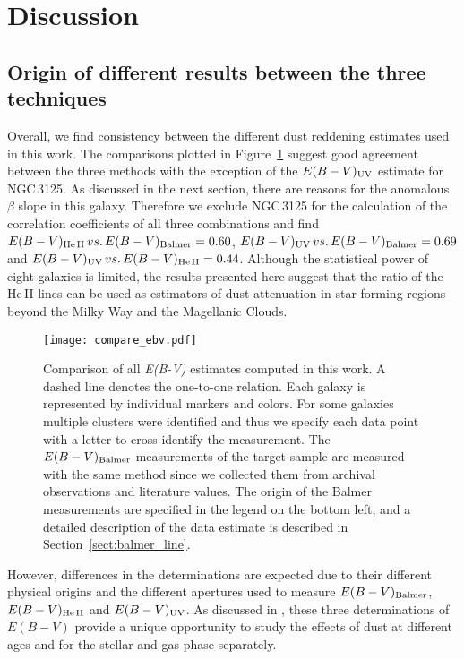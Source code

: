 \documentclass[]{aastex63}
\begin{document}
\section{Discussion}\label{sect:discussion}

\subsection{Origin of different results between the three techniques}
Overall, we find consistency between the different dust reddening estimates used in this work. The comparisons plotted in Figure~\ref{fig:compare_ebv} suggest good agreement between the three methods with the exception of the $E(B-V)_{\rm UV}$ estimate for NGC\,3125. As discussed in the next section, there are reasons for the anomalous $\beta$ slope in this galaxy. Therefore we exclude NGC\,3125 for the calculation of the correlation coefficients of all three combinations and find $E(B-V)_{\rm He\,II} \,vs.\, E(B-V)_{\rm Balmer} = 0.60$, $E(B-V)_{\rm UV} \,vs.\, E(B-V)_{\rm Balmer} = 0.69$ and $E(B-V)_{\rm UV} \,vs.\, E(B-V)_{\rm He\,II} = 0.44$.  Although the statistical power of eight galaxies is limited, the results presented here suggest that the ratio of the He\,II lines can be used as estimators of dust attenuation in star forming regions beyond the Milky Way and the Magellanic Clouds.


%
\begin{figure*}[h!]
    \centering
    \texttt{[image: compare\_ebv.pdf]}
    \caption{Comparison of all {\it E(B-V)} estimates computed in this work. A dashed line denotes the one-to-one relation. Each galaxy is represented by individual markers and colors. For some galaxies multiple clusters were identified and thus we specify each data point with a letter to cross identify the measurement. The ${E(B-V)_{\rm Balmer}}$ measurements of the target sample are measured with the same method since we collected them from archival observations and literature values. The origin of the Balmer measurements are specified in the legend on the bottom left, and a detailed description of the data estimate is described in Section~\ref{sect:balmer_line}. } 
    \label{fig:compare_ebv}
\end{figure*}

However, differences in the determinations are expected due to their different physical origins and the different apertures used to measure ${E(B-V)_{\rm Balmer}}$, ${E(B-V)_{\rm He\,II}}$ and ${E(B-V)_{\rm UV}}$. As discussed in \citet{leitherer_he_2019}, these three determinations of $E(B-V)$ provide a unique opportunity to study the effects of dust at different ages and for the stellar and gas phase separately.  
\end{document}
